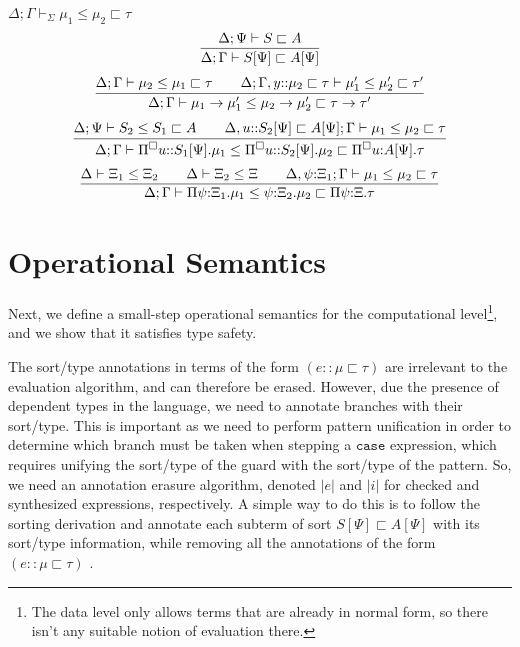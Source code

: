 \documentclass[letterpaper, 11pt]{article}
\newcommand{\rar}{\rightarrow}
\newcommand{\case}{\texttt{case}}
\begin{document}
    $\boxed{ \Delta; \Gamma \vdash_\Sigma \mu_1 \leq \mu_2 \sqsubset \tau}$
    \begin{align*}
      \infer{ \Delta; \Gamma \vdash S[\Psi] \sqsubset A[\Psi]}
            {
               \Delta; \Psi \vdash S \sqsubset A
            }
    \end{align*}
    \begin{align*}
      \infer{ \Delta; \Gamma \vdash\mu_1 \rar \mu_1' \leq \mu_2 \rar \mu_2' \sqsubset \tau \rar \tau'}
            {
               \Delta; \Gamma \vdash \mu_2 \leq \mu_1 \sqsubset \tau
              &&
               \Delta; \Gamma, y{::} \mu_2 \sqsubset \tau \vdash \mu_1' \leq \mu_2' \sqsubset \tau'
            }
    \end{align*}
    \begin{align*}
      \infer{ \Delta; \Gamma \vdash\Pi^\square u{::}S_1[\Psi]. \mu_1 \leq \Pi^\square u{::}S_2[\Psi]. \mu_2 \sqsubset \Pi^\square u{:} A[\Psi]. \tau}
            {
               \Delta; \Psi \vdash S_2 \leq S_1 \sqsubset A
              &&
               \Delta, u{::} S_2[\Psi] \sqsubset A[\Psi]; \Gamma \vdash \mu_1 \leq \mu_2 \sqsubset \tau
            }
    \end{align*}
    \begin{align*}
      \infer{ \Delta; \Gamma \vdash \Pi \psi{:}\Xi_1. \mu_1 \leq \psi{:}\Xi_2. \mu_2 \sqsubset \Pi \psi{:}\Xi. \tau}
            {
               \Delta \vdash \Xi_1 \leq \Xi_2
              &&
               \Delta \vdash \Xi_2 \leq \Xi
              &&
              \Delta,\psi{:}\Xi_1; \Gamma \vdash \mu_1 \leq \mu_2 \sqsubset \tau
            }
    \end{align*}

    \section{Operational Semantics}

    Next, we define a small-step operational semantics for the computational level\footnote{The data level only allows terms that are already in normal form,
    so there isn't any suitable notion of evaluation there.}, and we show that it satisfies type safety.

    The sort/type annotations in terms of the form $(e :: \mu \sqsubset \tau)$ are irrelevant to the evaluation algorithm, and can therefore be erased.  
    However, due the presence of dependent types in the language, we need to annotate branches with their sort/type.  This is important as we need to 
    perform pattern unification in order to determine which branch must be taken when stepping a $\case$ expression, which requires unifying the sort/type 
    of the guard with the sort/type of the pattern.  So, we need an annotation erasure algorithm, denoted $|e|$ and $|i|$ for checked and synthesized 
    expressions, respectively.  A simple way to do this is to follow the sorting derivation and annotate each subterm of sort $S[\Psi] \sqsubset A[\Psi]$ with
    its sort/type information, while removing all the annotations of the form $(e :: \mu \sqsubset \tau)$ \cite{PientkaDunfield2008}.
\end{document}
